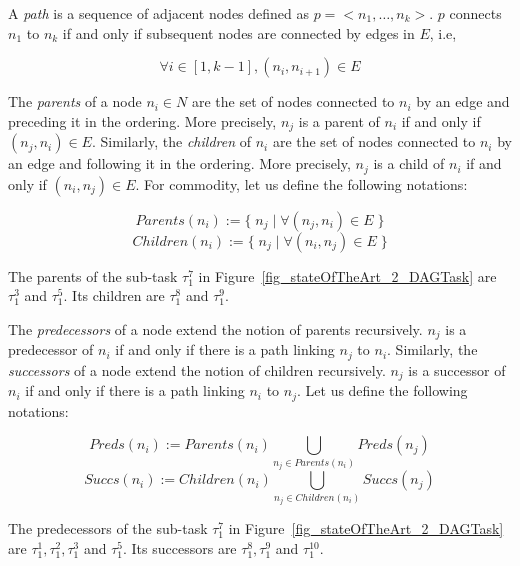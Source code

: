 \documentclass[main.tex]{subfiles}
\begin{document}
A \emph{path} is a sequence of adjacent nodes defined as $p = <n_1 , \ldots , n_k>$. $p$ connects $n_1$ to $n_k$ if and only if subsequent nodes are connected by edges in $E$, i.e, 

\begin{displaymath}
\forall i \in [1, k-1] , (n_i, n_{i+1}) \in E
\end{displaymath}


The \emph{parents} of a node $n_i \in N$  are the set of nodes connected to $n_i$ by an edge and preceding it in the ordering. More precisely, $n_j$ is a parent of $n_i$ if and only if $ (n_j, n_i) \in E$. Similarly, the \emph{children} of $n_i$ are the set of nodes connected to $n_i$ by an edge and following it in the ordering. More precisely, $n_j$ is a child of $n_i$ if and only if $ (n_i, n_j) \in E$. For commodity, let us define the following notations:

\begin{displaymath}
    Parents ( n_i ) := \{ \; n_j \; | \; \forall (n_j,n_i) \in E \; \}
\end{displaymath}
\begin{displaymath}
    Children ( n_i ) := \{ \; n_j \; | \; \forall (n_i,n_j) \in E \;\}
\end{displaymath}

\begin{example}
    The parents of the sub-task $\tau_1^7$ in Figure~\ref{fig_stateOfTheArt_2_DAGTask} are $\tau_1^3$ and $\tau_1^5$. Its children are $\tau_1^8$ and $\tau_1^9$.
\end{example}

The \emph{predecessors} of a node extend the notion of parents recursively. $n_j$ is a predecessor of $n_i$ if and only if there is a path linking $n_j$ to $n_i$. Similarly, the \emph{successors} of a node extend the notion of children recursively. $n_j$ is a successor of $n_i$ if and only if there is a path linking $n_i$ to $n_j$. Let us define the following notations:


\begin{displaymath}
    Preds ( n_i ) := Parents (n_i) \underset{n_j \in Parents(n_i)}{\bigcup} Preds (n_j)
\end{displaymath}
\begin{displaymath}
    Succs ( n_i ) := Children (n_i) \underset{n_j \in Children(n_i)}{\bigcup} Succs (n_j)
\end{displaymath}


\begin{example}
    The predecessors of the sub-task $\tau_1^7$ in Figure~\ref{fig_stateOfTheArt_2_DAGTask} are $\tau_1^1, \tau_1^2, \tau_1^3$ and $\tau_1^5$. Its successors are $\tau_1^8, \tau_1^9$ and $\tau_1^{10}$.
\end{example}
\end{document}
